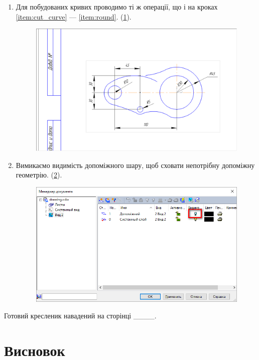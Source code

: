 \begin{enumerate}[leftmargin=*]
\item Для побудованих кривих проводимо ті ж операції, що і на кроках \ref{item:cut_curve} ---
  \ref{item:round}.  (\ref{fig:lab4:step10}).
  \begin{figure}[!ht]
    \centering \includegraphics[width=0.9\linewidth]{./images/lab4/step10.png}
    \caption{\label{fig:lab4:step10}}
  \end{figure}
  \FloatBarrier

\item Вимикаємо видимість допоміжного шару, щоб сховати непотрібну допоміжну
  геометрію. (\ref{fig:lab4:step11}).
  \begin{figure}[!ht]
    \centering \includegraphics[width=0.9\linewidth]{./images/lab4/step11.png}
    \caption{\label{fig:lab4:step11}}
  \end{figure}
  \FloatBarrier
  
\end{enumerate}

Готовий кресленик навадений на сторінці ____.

\newpage
\section{Висновок}
